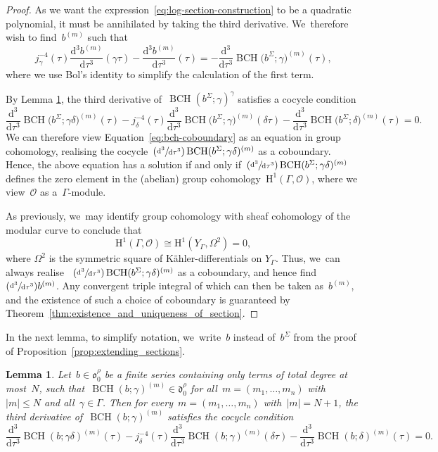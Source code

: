 \documentclass[10pt,a4paper]{article}
\numberwithin{equation}{section}
\newcommand{\Psfrac}[2]{(\sfrac{#1}{#2})}
\theoremstyle{plain}
\newtheorem{lemma}[theoremcounter]{Lemma}
\theoremstyle{definition}
\newcommand{\tx}{\text}
\newcommand{\nbd}{\nobreakdash-\hspace{0pt}}
\newcommand{\cO}{\ensuremath{\mathcal{O}}}
\newcommand{\frakd}{\ensuremath{\mathfrak{d}}}
\newcommand{\frako}{\ensuremath{\mathfrak{o}}}
\newcommand{\rmd}{\ensuremath{\mathrm{d}}}
\newcommand{\rmH}{\ensuremath{\mathrm{H}}}
\let\Ga\Gamma
\let\ga\gamma
\DeclareMathOperator{\BCH}{BCH}
\newcommand{\dtau}{\rmd \tau}
\begin{document}
\begin{proof}
As we want the expression~\eqref{eq:log-section-construction} to be a quadratic polynomial, it must be annihilated by taking the third derivative. We~therefore wish to find~$b^{(m)}$ such that
\begin{equation}\label{eq:bch-coboundary}
j_\ga^{-4}(\tau)\frac{\rmd^3b^{(m)}}{\dtau^3}(\ga\tau)
- \frac{\rmd^3b^{(m)}}{\dtau^3}(\tau)
=
- \frac{\rmd^3}{\dtau^3}\BCH\bigl(b^\Sigma;\ga \bigr)^{(m)}(\tau)
\tx{,}
\end{equation}
where we use Bol's identity to simplify the calculation of the first term.

By Lemma \ref{lem:BCH-cocycle}, the third derivative of~$\BCH(b^\Sigma;\ga)^{\ga}$ satisfies a cocycle condition
\begin{equation*}
\frac{\rmd^3}{\dtau^3}\BCH\bigl(b^\Sigma;\ga\delta \bigr)^{(m)}(\tau)
- j_\delta^{-4}(\tau)\frac{\rmd^3}{\dtau^3}\BCH\bigl(b^\Sigma;\ga \bigr)^{(m)}(\delta\tau)
- \frac{\rmd^3}{\dtau^3}\BCH\bigl(b^\Sigma;\delta \bigr)^{(m)}(\tau)
=
0.
\end{equation*}
We can therefore view Equation~\eqref{eq:bch-coboundary} as an equation in group cohomology, realising the cocycle~$\Psfrac{\rmd^3}{\dtau^3}\BCH(b^\Sigma;\ga\delta)^{(m)}$ as a coboundary. Hence, the above equation has a solution if and only if~$\Psfrac{\rmd^3}{\dtau^3}\BCH(b^\Sigma;\ga\delta)^{(m)}$ defines the zero element in the (abelian) group cohomology~$\rmH^1(\Ga,\cO)$, where we view~$\cO$ as a~$\Ga$\nbd{}module.

As previously, we~may identify group cohomology with sheaf cohomology of the modular curve to conclude that
\begin{equation*}
\rmH^1(\Ga,\cO)
\cong
\rmH^1(Y_\Ga, \Omega^2) = 0
\tx{,}
\end{equation*}
where $\Omega^2$ is the symmetric square of Kähler-differentials on $Y_\Ga$. Thus, we~can always realise ~$\Psfrac{\rmd^3}{\dtau^3}\BCH(b^\Sigma;\ga\delta)^{(m)}$ as a coboundary, and hence find~$\Psfrac{\rmd^3}{\dtau^3}b^{(m)}$. Any convergent triple integral of which can then be taken as~$b^{(m)}$, and the existence of such a choice of coboundary is guaranteed by Theorem~\ref{thm:existence_and_uniqueness_of_section}.
\end{proof}

In the next lemma, to simplify notation, we~write~$b$ instead of~$b^\Sigma$ from the proof of Proposition~\ref{prop:extending_sections}.


\begin{lemma}\label{lem:BCH-cocycle}
Let~$b\in \frako_0^\rho$ be a finite series containing only terms of total degree at most~$N$, such that~$\BCH(b;\ga)^{(m)}\in\frakd_0^\rho$ for all~$m=(m_1,\ldots,m_n)$ with~$|m|\leq N$ and all~$\ga\in\Ga$. Then for every~$m=(m_1,\ldots,m_n)$ with~$|m|=N+1$, the third derivative of\/~$\BCH(b;\ga)^{(m)}$ satisfies the cocycle condition
\begin{equation*}
\frac{\rmd^3}{\dtau^3}\BCH(b;\ga\delta)^{(m)}(\tau)
- j_\delta^{-4}(\tau)\frac{\rmd^3}{\dtau^3}\BCH(b;\ga)^{(m)}(\delta\tau)
- \frac{\rmd^3}{\dtau^3}\BCH(b;\delta)^{(m)}(\tau)
=
0
\tx{.}
\end{equation*}
\end{lemma}
\end{document}
